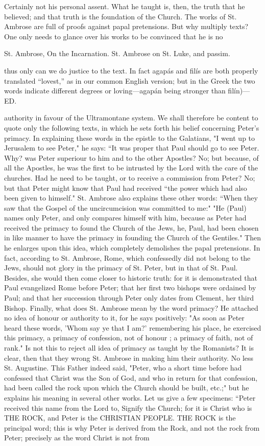 Certainly not his personal assent. What he taught is, then, the truth that he believed; and that truth is the foundation of the Church. The works of St. Ambrose are full of proofs against papal pretensions. But why multiply texts? One only needs to glance over his works to be convinced that he is no

St. Ambrose, On the Incarnation. St. Ambrose on St. Luke, and passim.

thus only can we do justice to the text. In fact agapás and filís are both properly translated “lovest,” as in our common English version; but in the Greek the two words indicate different degrees or loving—agapán being stronger than filín)—ED.

authority in favour of the Ultramontane system. We shall therefore be content to quote only the following texts, in which he sets forth his belief concerning Peter's primacy. In explaining these words in the epistle to the Galatians, "I went up to Jerusalem to see Peter," he says: “It was proper that Paul should go to see Peter. Why? was Peter superiour to him and to the other Apostles? No; but because, of all the Apostles, he was the first to be intrusted by the Lord with the care of the churches. Had he need to be taught, or to receive a commission from Peter? No; but that Peter might know that Paul had received “the power which had also been given to himself." St. Ambrose also explains these other words: “When they saw that the Gospel of the uncircumcision was committed to me:" "He (Paul) names only Peter, and only compares himself with him, because as Peter had received the primacy to found the Church of the Jews, he, Paul, had been chosen in like manner to have the primacy in founding the Church of the Gentiles." Then he enlarges upon this idea, which completely demolishes the papal pretensions. In fact, according to St. Ambrose, Rome, which confessedly did not belong to the Jews, should not glory in the primacy of St. Peter, but in that of St. Paul. Besides, she would then come closer to historic truth: for it is demonstrated that Paul evangelized Rome before Peter; that her first two bishops were ordained by Paul; and that her succession through Peter only dates from Clement, her third Bishop. Finally, what does St. Ambrose mean by the word primacy? He attached no idea of honour or authority to it, for he says positively: "As soon as Peter heard these words, 'Whom say ye that I am?’ remembering his place, he exercised this primacy, a primacy of confession, not of honour ; a primacy of faith, not of rank." Is not this to reject all idea of primacy as taught by the Romanists? It is clear, then that they wrong St. Ambrose in making him their authority. No less St. Augustine. This Father indeed said, "Peter, who a short time before had confessed that Christ was the Son of God, and who in return for that confession, had been called the rock upon which the Church should be built, etc.;" but he explains his meaning in several other works. Let us give a few specimens: “Peter received this name from the Lord to, Signify the Church; for it is Christ who is THE ROCK, and Peter is the CHRISTIAN PEOPLE. THE ROCK is the principal word; this is why Peter is derived from the Rock, and not the rock from Peter; precisely as the word Christ is not from 